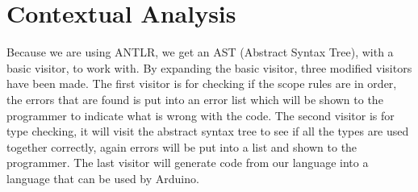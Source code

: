 \section{Contextual Analysis}
Because we are using ANTLR, we get an AST (Abstract Syntax Tree), with a basic visitor, to work with. By expanding the basic visitor, three modified visitors have been made. The first visitor is for checking if the scope rules are in order, the errors that are found is put into an error list which will be shown to the programmer to indicate what is wrong with the code. The second visitor is for type checking, it will visit the abstract syntax tree to see if all the types are used together correctly, again errors will be put into a list and shown to the programmer. The last visitor will generate code from our language into a language that can be used by Arduino.